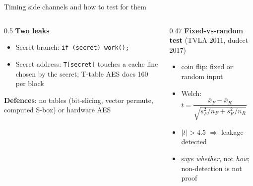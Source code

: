 \documentclass[aspectratio=169,11pt]{beamer}
\newcommand{\code}[1]{\texttt{#1}}
\begin{document}
\begin{frame}{Timing side channels and how to test for them}
\begin{columns}[T]
\begin{column}{0.5\textwidth}
\textbf{Two leaks}
\begin{itemize}
  \item \alert{Secret branch}: \code{if (secret) work();}
  \item \alert{Secret address}: \code{T[secret]} touches a cache line chosen by the secret; T-table AES does 160 per block
\end{itemize}
\textbf{Defences}: no tables (bit-slicing, vector permute, computed S-box) or hardware AES
\end{column}
\begin{column}{0.47\textwidth}
\textbf{Fixed-vs-random test} (TVLA 2011, dudect 2017)
\begin{itemize}
  \item coin flip: \alert{fixed} or \alert{random} input
  \item Welch: $t = \dfrac{\bar x_F - \bar x_R}{\sqrt{s_F^2/n_F + s_R^2/n_R}}$
  \item $\lvert t\rvert > 4.5$ $\Rightarrow$ leakage detected
  \item says \emph{whether}, not \emph{how}; non-detection is not proof
\end{itemize}
\end{column}
\end{columns}
\end{frame}
\end{document}
